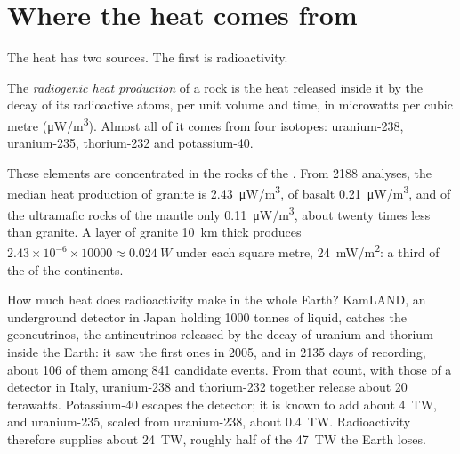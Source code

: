 \section{Where the heat comes from}

The heat has two sources. The first is radioactivity.

\begin{definition}\label{def:g12:internal-heat:heat-production}
The \emph{radiogenic heat production} of
a rock is the heat released inside it by the decay of its radioactive atoms,
per unit volume and time, in microwatts per cubic metre
(\unit{\micro W/m^3}). Almost all of it comes from four isotopes: uranium-238,
uranium-235, thorium-232 and potassium-40.
\end{definition}

These elements are concentrated in the rocks of the . From
2188 analyses, the median heat production of granite is
\qty{2.43}{\micro W/m^3}, of basalt \qty{0.21}{\micro W/m^3}, and of the
ultramafic rocks of the mantle only \qty{0.11}{\micro W/m^3}, about twenty
times less than granite. A layer of granite \qty{10}{km} thick produces
$2.43 \times 10^{-6} \times \num{10000} \approx \qty{0.024}{W}$ under each
square metre, \qty{24}{mW/m^2}: a third of the  of the continents.

How much heat does radioactivity make in the whole Earth? KamLAND, an
underground detector in Japan holding 1000 tonnes of liquid, catches the
geoneutrinos, the antineutrinos released by the decay of uranium and thorium
inside the Earth: it saw the first ones in 2005, and in 2135 days of
recording, about 106 of them among 841 candidate events. From that count,
with those of a detector in Italy, uranium-238 and thorium-232 together
release about 20 terawatts. Potassium-40 escapes the detector; it is known
to add about \qty{4}{TW}, and uranium-235, scaled from uranium-238, about
\qty{0.4}{TW}. Radioactivity therefore supplies about \qty{24}{TW},
roughly half of the \qty{47}{TW} the Earth loses.

